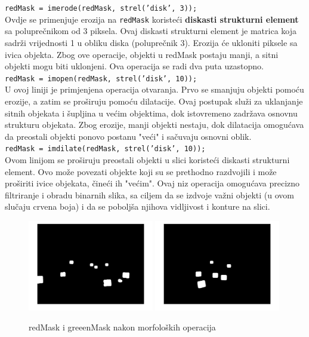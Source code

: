 \documentclass[a4paper,12pt]{article}
\begin{document}
\texttt{redMask = imerode(redMask, strel('disk', 3));}
\\

Ovdje se primenjuje erozija na \texttt{redMask} koristeći \textbf{diskasti strukturni element} sa poluprečnikom od 3 piksela. 
Ovaj diskasti strukturni element je matrica koja sadrži vrijednosti 1 u obliku diska (poluprečnik 3). 
Erozija će ukloniti piksele sa ivica objekta. 
Zbog ove operacije, objekti u redMask postaju manji, a sitni objekti mogu biti uklonjeni. Ova operacija se radi dva puta uzastopno.\\


\texttt{redMask = imopen(redMask, strel('disk', 10));}\\

U ovoj liniji je primjenjena operacija otvaranja. Prvo se smanjuju objekti pomoću erozije, a zatim se proširuju pomoću dilatacije.  
Ovaj postupak služi za uklanjanje sitnih objekata i šupljina u većim objektima, dok istovremeno zadržava osnovnu strukturu objekata. 
Zbog erozije, manji objekti nestaju, dok dilatacija omogućava da preostali objekti ponovo postanu "veći" i sačuvaju osnovni oblik.\\


\texttt{redMask = imdilate(redMask, strel('disk', 10));}\\

Ovom linijom se proširuju preostali objekti u slici koristeći diskasti strukturni element. Ovo može povezati objekte koji su se prethodno razdvojili i može proširiti ivice objekata, čineći ih "većim".
Ovaj niz operacija omogućava precizno filtriranje i obradu binarnih slika, sa ciljem da se izdvoje važni objekti (u ovom slučaju crvena boja) i da se poboljša njihova vidljivost i konture na slici.


\begin{figure}[htbp]
    \centering
    \includegraphics[width=0.49\textwidth]{img/morphred.jpg}
    \hfill
    \includegraphics[width=0.49\textwidth]{img/morphgreen.jpg} 
    \caption{redMask i greeenMask nakon morfoloških operacija}
    \label{fig:redMaskgreenMask}
\end{figure}
\end{document}
